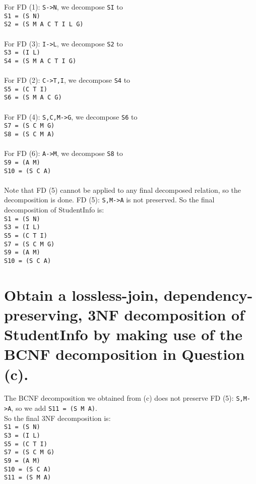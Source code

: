 \documentclass{article}
\begin{document}
For FD (1): \texttt{S->N}, we decompose \texttt{SI} to\\
\texttt{S1 = (S N)} \\
\texttt{S2 = (S M A C T I L G)} \\
\\
For FD (3): \texttt{I->L}, we decompose \texttt{S2} to\\
\texttt{S3 = (I L)} \\
\texttt{S4 = (S M A C T I G)} \\
\\
For FD (2): \texttt{C->T,I}, we decompose \texttt{S4} to \\
\texttt{S5 = (C T I)} \\
\texttt{S6 = (S M A C G)} \\
\\
For FD (4): \texttt{S,C,M->G}, we decompose \texttt{S6} to \\
\texttt{S7 = (S C M G)} \\
\texttt{S8 = (S C M A)} \\
\\
For FD (6): \texttt{A->M}, we decompose \texttt{S8} to \\
\texttt{S9 = (A M)} \\
\texttt{S10 = (S C A)}\\
\\
Note that FD (5) cannot be applied to any final decomposed relation, so the decomposition is done. FD (5): \texttt{S,M->A} is not preserved. So the final decomposition of StudentInfo is:\\
\texttt{S1 = (S N)} \\
\texttt{S3 = (I L)} \\
\texttt{S5 = (C T I)} \\
\texttt{S7 = (S C M G)} \\
\texttt{S9 = (A M)} \\
\texttt{S10 = (S C A)}\\



\section{Obtain a lossless-join, dependency-preserving, 3NF decomposition of StudentInfo by
making use of the BCNF decomposition in Question (c).}
The BCNF decomposition we obtained from (c) does not preserve FD (5): \texttt{S,M->A}, so we add \texttt{S11 = (S M A)}.\\
So the final 3NF decomposition is: \\
\texttt{S1 = (S N)} \\
\texttt{S3 = (I L)} \\
\texttt{S5 = (C T I)} \\
\texttt{S7 = (S C M G)} \\
\texttt{S9 = (A M)} \\
\texttt{S10 = (S C A)}\\
\texttt{S11 = (S M A)}
\end{document}
